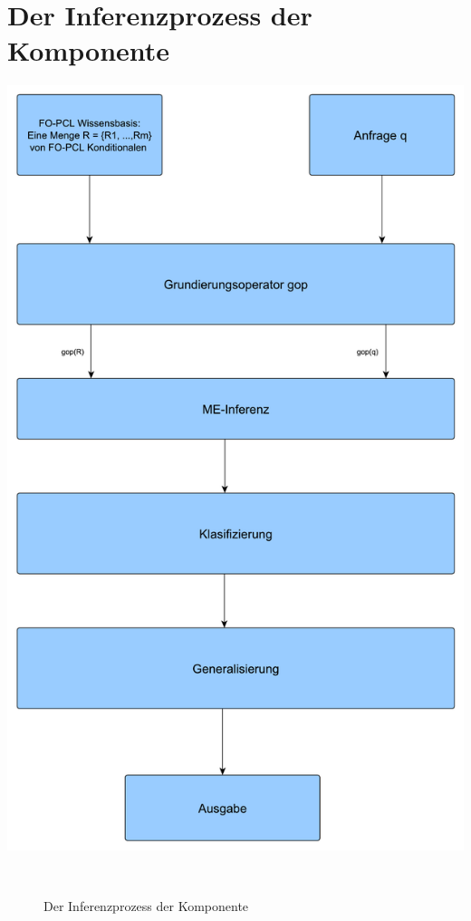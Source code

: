 \documentclass[draft]{scrreprt}
\begin{document}
\section{Der Inferenzprozess der Komponente}
\includegraphics[scale = 0.4]{Graphics/Inferenzprozess_Komponente}
\begin{figure}[h]
	\caption{Der Inferenzprozess der Komponente }\
\end{figure}
\\
	
\end{document}
